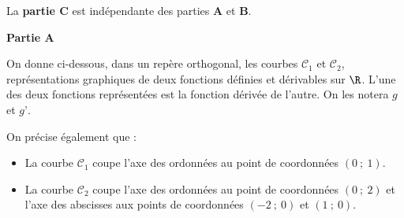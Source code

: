 
\medskip

La \textbf{partie C} est indépendante des parties \textbf{A} et \textbf{B}.

\medskip

\textbf{Partie A}

\medskip

On donne ci-dessous, dans un repère orthogonal, les courbes $\mathcal{C}_{1}$ et $\mathcal{C}_{2}$, représentations graphiques de deux fonctions définies et dérivables sur $\R$. L'une des deux fonctions représentées est la fonction dérivée de l'autre. On les notera $g$ et $g’$.

On précise également que :
\begin{itemize}
\item La courbe $\mathcal{C}_{1}$ coupe l'axe des ordonnées au point de coordonnées $(0~;~1)$.
\item La courbe $\mathcal{C}_{2}$ coupe l'axe des ordonnées au point de coordonnées $(0~;~2)$ et l'axe des abscisses aux points de coordonnées $(-2~;~0)$ et $(1~;~0)$.
\end{itemize}

\begin{center}

\end{center}

